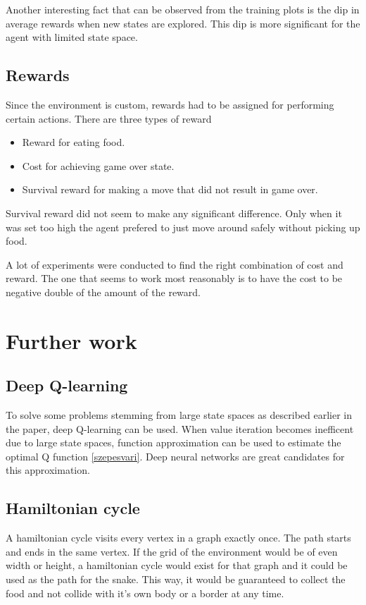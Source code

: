 \documentclass[lettersize,journal]{IEEEtran}
\begin{document}
Another interesting fact that can be observed from the training plots is
the dip in average rewards when new states are explored. This dip
is more significant for the agent with limited state space.


\subsection{Rewards}
Since the environment is custom, rewards had to be assigned for
performing certain actions. There are three types of reward
\begin{itemize}
    \item Reward for eating food.
    \item Cost for achieving game over state.
    \item Survival reward for making a move that did not result
        in game over.
\end{itemize}

Survival reward did not seem to make any significant difference.
Only when it was set too high the agent prefered to just move
around safely without picking up food.

A lot of experiments were conducted to find the right combination
of cost and reward. The one that seems to work most reasonably
is to have the cost to be negative double of the amount of the reward.

\section{Further work}
\subsection{Deep Q-learning}
To solve some problems stemming from large state spaces as described earlier in
the paper, deep Q-learning can be used. When value iteration becomes
inefficent due to large state spaces, function approximation can be used
to estimate the optimal Q function \ref{szepesvari}. Deep neural networks
are great candidates for this approximation.

\subsection{Hamiltonian cycle}
A hamiltonian cycle visits every vertex in a graph exactly once.
The path starts and ends in the same vertex.
If the grid of the environment would be of even width or height,
a hamiltonian cycle would exist for that graph \cite{cycle} and it could be
used as the path for the snake. This way, it would be guaranteed
to collect the food and not collide with it's own body or a border
at any time.
\end{document}
